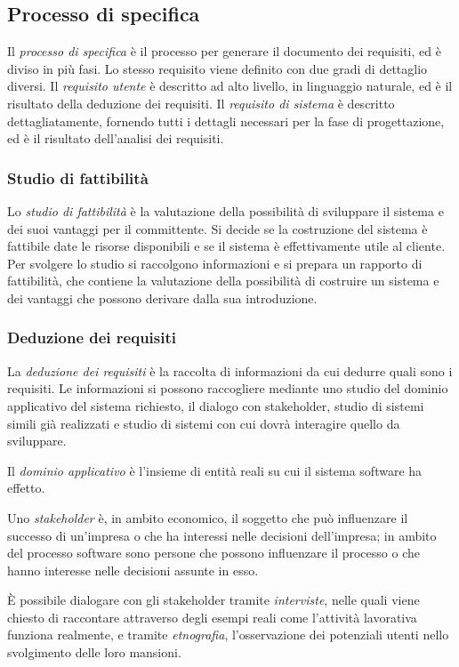 \documentclass[11pt]{article}
\begin{document}
\subsection{Processo di specifica}
Il \textit{processo di specifica} è il processo per generare il documento dei requisiti, ed è diviso in più fasi.
Lo stesso requisito viene definito con due gradi di dettaglio diversi. Il \textit{requisito utente} è descritto ad alto 
livello, in linguaggio naturale, ed è il risultato della deduzione dei requisiti.
Il \textit{requisito di sistema} è descritto dettagliatamente, fornendo tutti i dettagli necessari per la fase di progettazione,
ed è il risultato dell'analisi dei requisiti.
\subsubsection*{Studio di fattibilità}
Lo \textit{studio di fattibilità} è la valutazione della possibilità di sviluppare il sistema e dei suoi vantaggi per 
il committente. Si decide se la costruzione del sistema è fattibile date le risorse disponibili e se il sistema è 
effettivamente utile al cliente.
Per svolgere lo studio si raccolgono informazioni e si prepara un rapporto di fattibilità, che contiene la valutazione 
della possibilità di costruire un sistema e dei vantaggi che possono derivare dalla sua introduzione.
\subsubsection*{Deduzione dei requisiti}
La \textit{deduzione dei requisiti} è la raccolta di informazioni da cui dedurre quali sono i requisiti.
Le informazioni si possono raccogliere mediante uno studio del dominio applicativo del sistema richiesto, il dialogo con 
stakeholder, studio di sistemi simili già realizzati e studio di sistemi con cui dovrà interagire quello da sviluppare.

Il \textit{dominio applicativo} è l'insieme di entità reali su cui il sistema software ha effetto.

Uno \textit{stakeholder} è, in ambito economico, il soggetto che può influenzare il successo di un'impresa o che ha 
interessi nelle decisioni dell'impresa; in ambito del processo software sono persone che possono influenzare il processo 
o che hanno interesse nelle decisioni assunte in esso.

È possibile dialogare con gli stakeholder tramite \textit{interviste}, nelle quali viene chiesto di raccontare attraverso 
degli esempi reali come l'attività lavorativa funziona realmente, e tramite \textit{etnografia}, l'osservazione dei potenziali 
utenti nello svolgimento delle loro mansioni.
\end{document}
